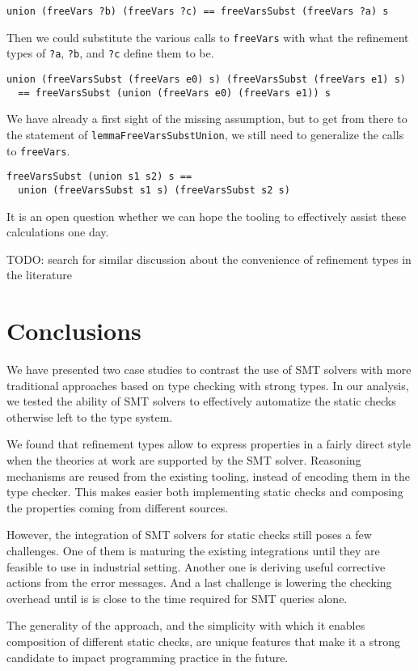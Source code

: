 \documentclass[acmtog, anonymous]{acmart}
\newcommand{\tc}[1]{{\small\texttt{#1}}}
\begin{document}
\begin{verbatim}
union (freeVars ?b) (freeVars ?c) == freeVarsSubst (freeVars ?a) s
\end{verbatim}

Then we could substitute the various calls to \tc{freeVars} with what
the refinement types of \tc{?a}, \tc{?b}, and \tc{?c} define them to be.

\begin{verbatim}
union (freeVarsSubst (freeVars e0) s) (freeVarsSubst (freeVars e1) s)
  == freeVarsSubst (union (freeVars e0) (freeVars e1)) s
\end{verbatim}

We have already a first sight of the missing assumption, but to get from
there to the statement of \tc{lemmaFreeVarsSubstUnion}, we still need
to generalize the calls to \tc{freeVars}.

\begin{verbatim}
freeVarsSubst (union s1 s2) s ==
  union (freeVarsSubst s1 s) (freeVarsSubst s2 s)
\end{verbatim}

It is an open question whether we can hope the tooling to effectively
assist these calculations one day.

TODO: search for similar discussion about the convenience of refinement types in the literature


\section{Conclusions}
\label{conclusions}

We have presented two case studies to contrast the use of SMT solvers
with more traditional approaches based on type checking with strong types. In
our analysis, we tested the ability of SMT solvers to effectively automatize
the static checks otherwise left to the type system.

We found that refinement types allow to express properties in a fairly direct
style when the theories at work are supported by the SMT solver. Reasoning
mechanisms are reused from the existing tooling, instead of encoding them
in the type checker. This makes easier both implementing static checks and
composing the properties coming from different sources.

However, the integration of SMT solvers for static checks still poses a few
challenges. One of them is maturing the existing integrations until they are
feasible to use in industrial setting. Another one is deriving useful
corrective actions from the error messages. And a last challenge is lowering
the checking overhead until is is close to the time required for SMT queries
alone.

The generality of the approach, and the simplicity with which it enables
composition of different static checks, are unique features that make it a strong
candidate to impact programming practice in the future.



\end{document}
